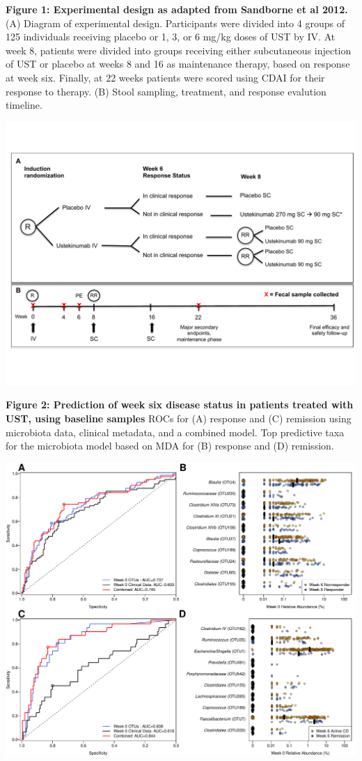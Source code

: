 \documentclass[11pt,]{article}
\begin{document}
\textbf{Figure 1: Experimental design as adapted from Sandborne et al
2012.} (A) Diagram of experimental design. Participants were divided
into 4 groups of 125 individuals receiving placebo or 1, 3, or 6 mg/kg
doses of UST by IV. At week 8, patients were divided into groups
receiving either subcutaneous injection of UST or placebo at weeks 8 and
16 as maintenance therapy, based on response at week six. Finally, at 22
weeks patients were scored using CDAI for their response to therapy. (B)
Stool sampling, treatment, and response evalution timeline.

\includegraphics{figures/Figure1_expdesign.pdf}

\newpage

\textbf{Figure 2: Prediction of week six disease status in patients
treated with UST, using baseline samples} ROCs for (A) response and (C)
remission using microbiota data, clinical metadata, and a combined
model. Top predictive taxa for the microbiota model based on MDA for (B)
response and (D) remission.

\includegraphics{figures/Figure2_wk0Xwk6pred.pdf}
\end{document}
